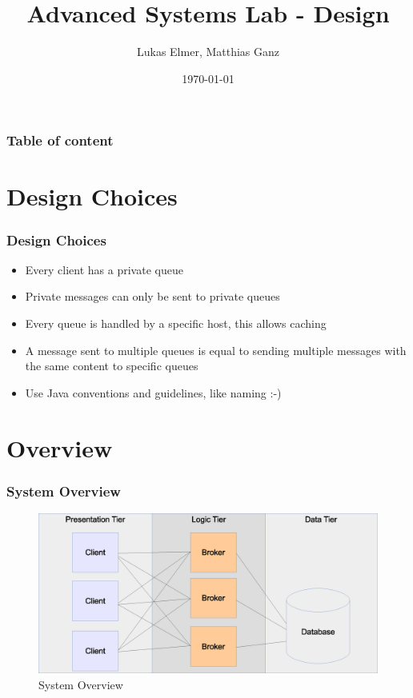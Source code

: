 \documentclass{beamer}
\title{Advanced Systems Lab - Design}
\author{Lukas Elmer, Matthias Ganz}
\date{\today}
\begin{document}
\begin{frame}
\titlepage
\end{frame} 

\begin{frame}
\frametitle{Table of content}
\tableofcontents
\end{frame} 


\section{Design Choices}
\begin{frame}
\frametitle{Design Choices}

\begin{itemize}
\item{Every client has a private queue}
\item{Private messages can only be sent to private queues}
\item{Every queue is handled by a specific host, this allows caching}
\item{A message sent to multiple queues is equal to sending multiple messages with the same content to specific queues}
\item{Use Java conventions and guidelines, like naming :-)}
\end{itemize}

\end{frame}



\section{Overview}
\begin{frame}
\frametitle{System Overview}

\begin{figure}
  \begin{center}
  
    \includegraphics[scale=0.3]{../../drawings/system-overview.eps}
    
  \end{center}
  \caption{System Overview}
  \label{fig:system-overview}
\end{figure}


\end{frame}
\end{document}

